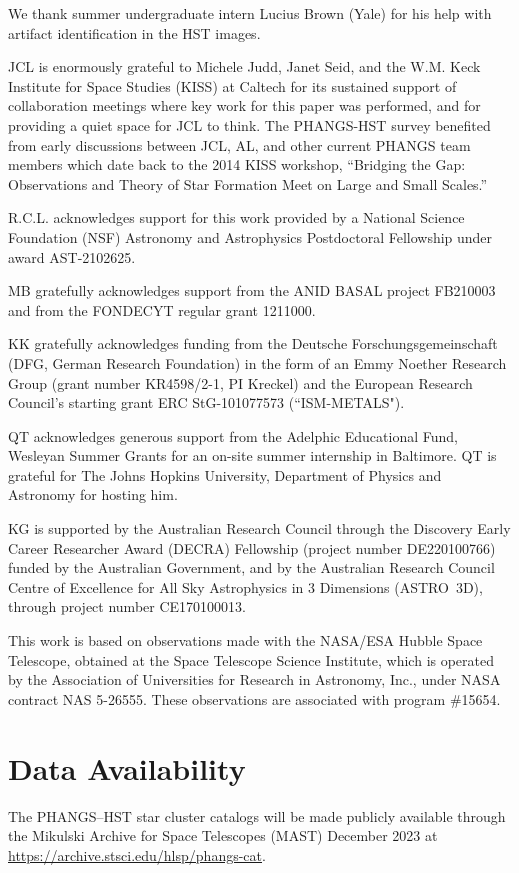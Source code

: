 \documentclass[linenumbers]{aastex63}
\begin{document}
{We thank summer undergraduate intern Lucius Brown (Yale) for his help with artifact identification in the HST images.

JCL is enormously grateful to Michele Judd, Janet Seid, and the W.M. Keck Institute for Space Studies (KISS) at Caltech for its sustained support of collaboration meetings where key work for this paper was performed, and for providing a quiet space for JCL to think.  The PHANGS-HST survey benefited from early discussions between JCL, AL, and other current PHANGS team members which date back to the 2014 KISS workshop, ``Bridging the Gap: Observations and Theory of Star Formation Meet on Large and Small Scales.''

R.C.L. acknowledges support for this work provided by a National Science Foundation (NSF) Astronomy and Astrophysics Postdoctoral Fellowship under award AST-2102625.

MB gratefully acknowledges support from the ANID BASAL project FB210003 and from the FONDECYT regular grant 1211000.

KK gratefully acknowledges funding from the Deutsche Forschungsgemeinschaft (DFG, German Research Foundation) in the form of an Emmy Noether Research Group (grant number KR4598/2-1, PI Kreckel) and the European Research Council’s starting grant ERC StG-101077573 (“ISM-METALS"). 

QT acknowledges generous support from the Adelphic Educational Fund, Wesleyan Summer Grants for an on-site summer internship in Baltimore. QT is grateful for The Johns Hopkins University, Department of Physics and Astronomy for hosting him.

KG is supported by the Australian Research Council through the Discovery Early Career Researcher Award (DECRA) Fellowship (project number DE220100766) funded by the Australian Government, and by the Australian Research Council Centre of Excellence for All Sky Astrophysics in 3 Dimensions (ASTRO~3D), through project number CE170100013.

This work is based on observations made with the NASA/ESA Hubble Space Telescope, obtained at the Space Telescope Science Institute, which is operated by the Association of Universities for Research in Astronomy, Inc., under NASA contract NAS 5-26555. These observations are associated with program \#15654. 


\section*{Data Availability}
The PHANGS--HST star cluster catalogs will be made publicly available through the Mikulski Archive for Space Telescopes (MAST) December 2023 at \url{https://archive.stsci.edu/hlsp/phangs-cat}.

}
\end{document}
